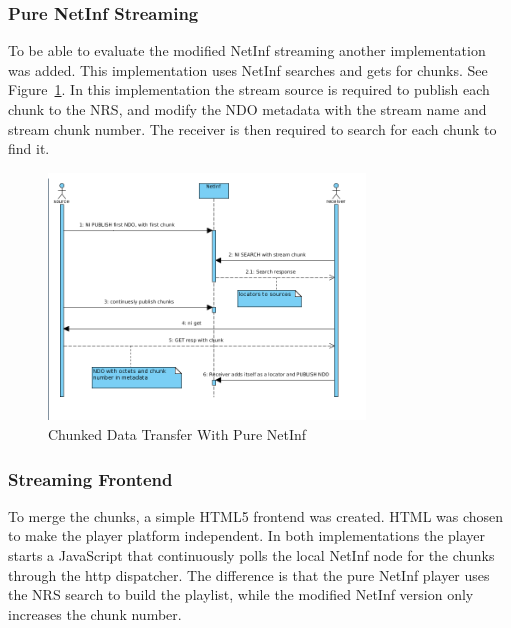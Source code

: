 \subsubsection{Pure NetInf Streaming}
To be able to evaluate the modified NetInf streaming another implementation was added. This implementation uses NetInf searches and gets for chunks. See Figure~\ref{fig:stream-seq-pure}. In this implementation the stream source is required to publish each chunk to the NRS, and modify the NDO metadata with the stream name and stream chunk number. The receiver is then required to search for each chunk to find it. 

\begin{figure}[h!]
	\centering
		\includegraphics[width=0.75\textwidth]{./img/sequence_diagram_pure_streaming.png}
    	\caption{Chunked Data Transfer With Pure NetInf}
	\label{fig:stream-seq-pure}
\end{figure}

\subsubsection{Streaming Frontend}
To merge the chunks, a simple HTML5 frontend was created. HTML was chosen to make the player platform independent.
In both implementations the player starts a JavaScript that continuously polls the local NetInf node for the chunks through the http dispatcher.
The difference is that the pure NetInf player uses the NRS search to build the playlist, while the modified NetInf version only increases the chunk number.
